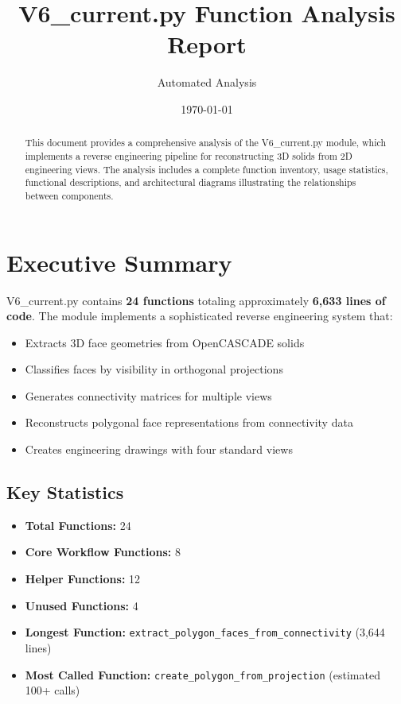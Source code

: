 \documentclass[11pt,a4paper]{article}
\title{V6\_current.py Function Analysis Report}
\author{Automated Analysis}
\date{\today}
\begin{document}
\maketitle

\begin{abstract}
This document provides a comprehensive analysis of the V6\_current.py module, which implements a reverse engineering pipeline for reconstructing 3D solids from 2D engineering views. The analysis includes a complete function inventory, usage statistics, functional descriptions, and architectural diagrams illustrating the relationships between components.
\end{abstract}

\tableofcontents
\newpage

\section{Executive Summary}

V6\_current.py contains \textbf{24 functions} totaling approximately \textbf{6,633 lines of code}. The module implements a sophisticated reverse engineering system that:

\begin{itemize}
    \item Extracts 3D face geometries from OpenCASCADE solids
    \item Classifies faces by visibility in orthogonal projections
    \item Generates connectivity matrices for multiple views
    \item Reconstructs polygonal face representations from connectivity data
    \item Creates engineering drawings with four standard views
\end{itemize}

\subsection{Key Statistics}
\begin{itemize}
    \item \textbf{Total Functions:} 24
    \item \textbf{Core Workflow Functions:} 8
    \item \textbf{Helper Functions:} 12
    \item \textbf{Unused Functions:} 4
    \item \textbf{Longest Function:} \texttt{extract\_polygon\_faces\_from\_connectivity} (3,644 lines)
    \item \textbf{Most Called Function:} \texttt{create\_polygon\_from\_projection} (estimated 100+ calls)
\end{itemize}
\end{document}
